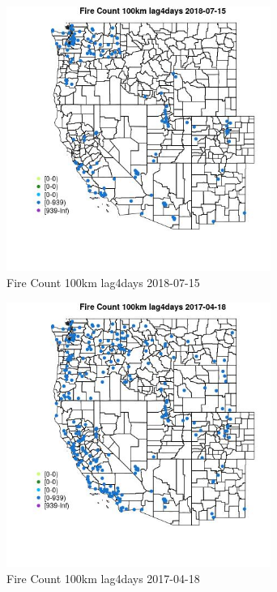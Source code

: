 \begin{figure} 
\centering  
\includegraphics[width=0.77\textwidth]{Code_Outputs/Report_ML_input_PM25_Step4_part_e_de_duplicated_aves_compiled_2019-05-21wNAs_MapObsFire_Count_100km_lag4days2018-07-15.jpg} 
\caption{\label{fig:Report_ML_input_PM25_Step4_part_e_de_duplicated_aves_compiled_2019-05-21wNAsMapObsFire_Count_100km_lag4days2018-07-15}Fire Count 100km lag4days 2018-07-15} 
\end{figure} 
 

\clearpage 

\begin{figure} 
\centering  
\includegraphics[width=0.77\textwidth]{Code_Outputs/Report_ML_input_PM25_Step4_part_e_de_duplicated_aves_compiled_2019-05-21wNAs_MapObsFire_Count_100km_lag4days2017-04-18.jpg} 
\caption{\label{fig:Report_ML_input_PM25_Step4_part_e_de_duplicated_aves_compiled_2019-05-21wNAsMapObsFire_Count_100km_lag4days2017-04-18}Fire Count 100km lag4days 2017-04-18} 
\end{figure} 
 

